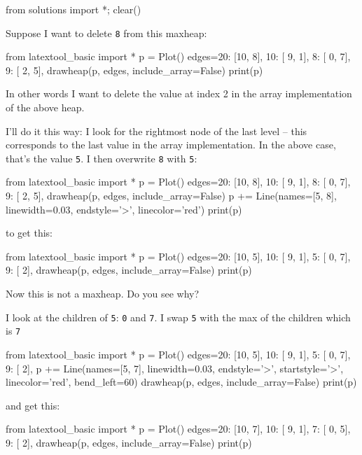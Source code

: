\begin{python0}
from solutions import *; clear()
\end{python0}

Suppose I want to delete
  \texttt{8}
  from this maxheap:

  \begin{python}
from latextool_basic import *
p = Plot()
edges={20: [10, 8],
       10: [ 9, 1],
        8: [ 0, 7],
        9: [ 2, 5],
       }
drawheap(p, edges, include_array=False)
print(p)
\end{python}

In other words I want to delete the value at index 2
in the array implementation of the above heap.

I'll do it this way:
I look for the rightmost node of the last level --
this corresponds to the last value in the array implementation.
In the above case, that's the value \texttt{5}.
I then overwrite \texttt{8} with \texttt{5}:

\begin{python}
from latextool_basic import *
p = Plot()
edges={20: [10, 8],
       10: [ 9, 1],
        8: [ 0, 7],
        9: [ 2, 5],
       }
drawheap(p, edges, include_array=False)
p += Line(names=[5, 8], linewidth=0.03, endstyle='>', linecolor='red')
print(p)
\end{python}

to get this:

\begin{python}
from latextool_basic import *
p = Plot()
edges={20: [10, 5],
       10: [ 9, 1],
        5: [ 0, 7],
        9: [ 2],
       }
drawheap(p, edges, include_array=False)
print(p)
\end{python}

Now this is not a maxheap. Do you see why?

I look at the children of \texttt{5}: \texttt{0} and \texttt{7}.
I swap \texttt{5} with the max of the children which is \texttt{7}

\begin{python}
from latextool_basic import *
p = Plot()
edges={20: [10, 5],
       10: [ 9, 1],
        5: [ 0, 7],
        9: [ 2],
      }
p += Line(names=[5, 7], linewidth=0.03, endstyle='>',
      startstyle='>', linecolor='red', bend_left=60)
drawheap(p, edges, include_array=False)
print(p)
\end{python}

and get this:

\begin{python}
from latextool_basic import *
p = Plot()
edges={20: [10, 7],
       10: [ 9, 1],
        7: [ 0, 5],
        9: [ 2],
      }
drawheap(p, edges, include_array=False)
print(p)
\end{python}

